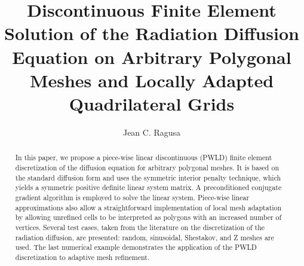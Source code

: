 \documentclass[preprint,10pt]{elsarticle}
\begin{document}
 

\begin{frontmatter}



\title{Discontinuous Finite Element Solution of the Radiation Diffusion Equation on Arbitrary Polygonal Meshes
and Locally Adapted Quadrilateral Grids}


\author{Jean C. Ragusa}
\address{Department of Nuclear Engineering, Texas A\&M University, College Station, TX 77843, USA}


\begin{abstract}

In this paper, we propose a piece-wise linear discontinuous (PWLD) finite element discretization of the diffusion equation for arbitrary 
polygonal meshes. It is based on the standard diffusion form and uses the symmetric interior penalty technique, which yields a 
symmetric positive definite linear system matrix. A preconditioned conjugate gradient algorithm is employed to solve the linear system. 
Piece-wise linear approximations also allow a straightforward implementation of local mesh adaptation by allowing unrefined cells to
be interpreted as polygons with an increased number of vertices.
Several test cases, taken from the literature on the discretization of the radiation diffusion, are presented: random, sinusoidal, 
Shestakov, and Z meshes are used. The last numerical example demonstrates the application of the PWLD discretization to adaptive 
mesh refinement.
 


\end{abstract}
\end{frontmatter}
\end{document}
